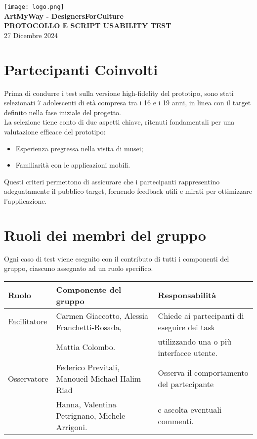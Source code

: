 \documentclass{article}
\begin{document}
\begin{center}
    \texttt{[image: logo.png]} \\[1em]
    {\LARGE \textbf{ArtMyWay - DesignersForCulture}} \\[0.5em]
    {\Large \textbf{PROTOCOLLO E SCRIPT USABILITY TEST}} \\[1.5em]
    {\large 27 Dicembre 2024}
\end{center}

\section{Partecipanti Coinvolti}
Prima di condurre i test sulla versione high-fidelity del prototipo, sono stati selezionati 7 adolescenti di et\`a compresa tra i 16 e i 19 anni, in linea con il target definito nella fase iniziale del progetto. \\ La selezione tiene conto di due aspetti chiave, ritenuti fondamentali per una valutazione efficace del prototipo:
\begin{itemize}
    \item Esperienza pregressa nella visita di musei;
    \item Familiarit\`a con le applicazioni mobili.
\end{itemize}
Questi criteri permettono di assicurare che i partecipanti rappresentino adeguatamente il pubblico target, fornendo feedback utili e mirati per ottimizzare l'applicazione.

\section{Ruoli dei membri del gruppo}
Ogni caso di test viene eseguito con il contributo di tutti i componenti del gruppo, ciascuno assegnato ad un ruolo specifico.

\begin{table}[h!]
    \centering
    \begin{tabular}{|l|l|p{7cm}|}
        \hline
        \textbf{Ruolo} & \textbf{Componente del gruppo} & \textbf{Responsabilit\`a} \\
        \hline
        Facilitatore & Carmen Giaccotto, Alessia Franchetti-Rosada, & Chiede ai partecipanti di eseguire dei task \\ & Mattia Colombo. & utilizzando una o pi\`u interfacce utente.\\
        \hline
        Osservatore & Federico Previtali, Manoueil Michael Halim Riad & Osserva il comportamento del partecipante \\ & Hanna, Valentina Petrignano, Michele Arrigoni. & e ascolta eventuali commenti.\\
        \hline
    \end{tabular}
\end{table}
\end{document}
